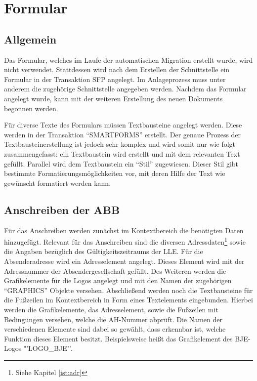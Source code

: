 \FloatBarrier
\section{Formular}
\subsection{Allgemein}

Das Formular, welches im Laufe der automatischen Migration erstellt wurde, wird nicht verwendet. Stattdessen wird nach dem Erstellen der Schnittstelle ein Formular in der Transaktion SFP angelegt. Im Anlageprozess muss unter anderem die zugehörige Schnittstelle angegeben werden. Nachdem das Formular angelegt wurde, kann mit der weiteren Erstellung des neuen Dokuments begonnen werden.

Für diverse Texte des Formulars müssen Textbausteine angelegt werden. Diese werden in der Transaktion "`SMARTFORMS"' erstellt. Der genaue Prozess der Textbausteinerstellung ist jedoch sehr komplex und wird somit nur wie folgt zusammengefasst: ein Textbaustein wird erstellt und mit dem relevanten Text gefüllt. Parallel wird dem Textbaustein ein "`Stil"' zugewiesen. Dieser Stil gibt bestimmte Formatierungsmöglichkeiten vor, mit deren Hilfe der Text wie gewünscht formatiert werden kann.

\subsection{Anschreiben der \acs{ABB}}

Für das Anschreiben werden zunächst im Kontextbereich die benötigten Daten hinzugefügt. Relevant für das Anschreiben sind die diversen Adressdaten\footnote{Siehe Kapitel \ref{ist:adr}} sowie die Angaben bezüglich des Gültigkeitszeitraums der \ac{LLE}. Für die Absenderadresse wird ein Adresselement angelegt. Dieses Element wird mit der Adressnummer der Absendergesellschaft gefüllt. Des Weiteren werden die Grafikelemente für die Logos angelegt und mit den Namen der zugehörigen "`GRAPHICS"' Objekte versehen. Abschließend werden noch die Textbausteine für die Fußzeilen im Kontextbereich in Form eines Textelements eingebunden. Hierbei werden die Grafikelemente, das Adresselement, sowie die Fußzeilen mit Bedingungen versehen, welche die \ac{AH}-Nummer abprüft. Die Namen der verschiedenen Elemente sind dabei so gewählt, dass erkennbar ist, welche Funktion dieses Element besitzt. Beispielsweise heißt das Grafikelement des \ac{BJE}-Logos "'LOGO\_BJE"'. 

